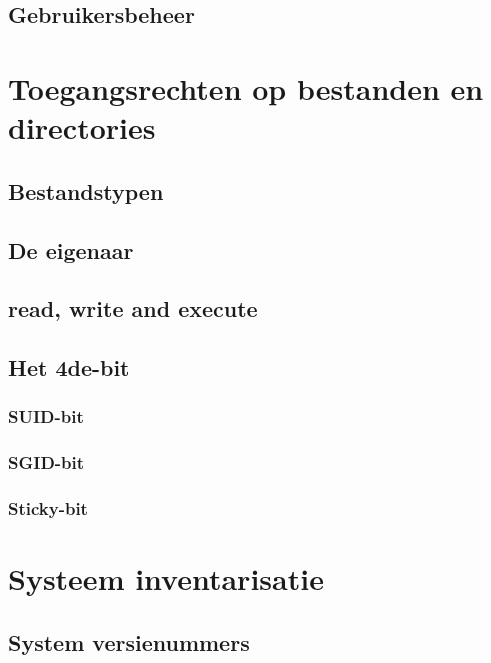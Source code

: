 \documentclass[a4paper,12pt,twoside,openright,titlepage]{book}
\begin{document}
\section{Gebruikersbeheer}







\chapter{Toegangsrechten op bestanden en directories}


\section{Bestandstypen}

\section{De eigenaar}

\section{read, write and execute}


\section{Het 4de-bit}

\subsection{SUID-bit}

\subsection{SGID-bit}

\subsection{Sticky-bit}


\chapter{Systeem inventarisatie}

\section{System versienummers}

\end{document}
